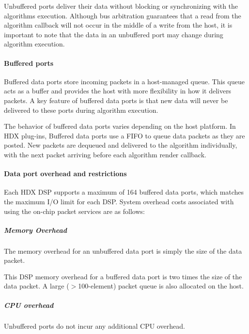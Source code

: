 Unbuffered ports deliver their data without blocking or synchronizing with the algorithm\textquotesingle{}s execution. Although bus arbitration guarantees that a read from the algorithm callback will not occur in the middle of a write from the host, it is important to note that the data in an unbuffered port may change during algorithm execution.

\hypertarget{a00832_subsubsection__buffered_ports_}{}\paragraph{Buffered ports}\label{a00832_subsubsection__buffered_ports_}
 Buffered data ports store incoming packets in a host-\/managed queue. This queue acts as a buffer and provides the host with more flexibility in how it delivers packets. A key feature of buffered data ports is that new data will never be delivered to these ports during algorithm execution.

The behavior of buffered data ports varies depending on the host platform. In H\+DX plug-\/ins, Buffered data ports use a F\+I\+FO to queue data packets as they are posted. New packets are dequeued and delivered to the algorithm individually, with the next packet arriving before each algorithm render callback.

\hypertarget{a00832_subsubsection__data_port_overhead_and_restrictions_}{}\paragraph{Data port overhead and restrictions}\label{a00832_subsubsection__data_port_overhead_and_restrictions_}
 Each H\+DX D\+SP supports a maximum of 164 buffered data ports, which matches the maximum I/O limit for each D\+SP. System overhead costs associated with using the on-\/chip packet services are as follows\+: \subparagraph*{Memory Overhead}

 
\begin{DoxyItemize}
\item The memory overhead for an unbuffered data port is simply the size of the data packet.  
\item This D\+SP memory overhead for a buffered data port is two times the size of the data packet. A large ($>$100-\/element) packet queue is also allocated on the host.  
\end{DoxyItemize}\subparagraph*{C\+PU overhead}

 Unbuffered ports do not incur any additional C\+PU overhead.

